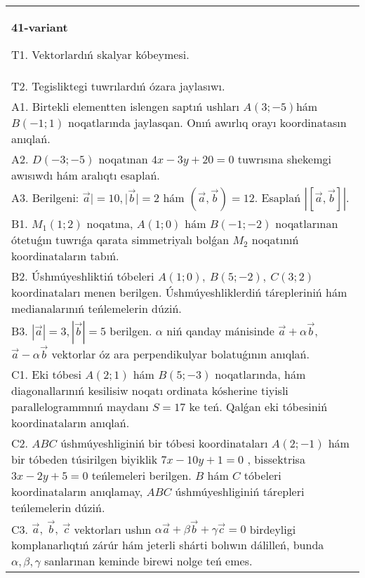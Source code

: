 \documentclass{article}
\begin{document}
\begin{tabular}{m{17cm}}
\textbf{41-variant}
\newline

T1. 
Vektorlardıń skalyar kóbeymesi.
 \\
T2. 
Tegisliktegi tuwrılardıń ózara jaylasıwı.
 \\
A1. 
Birtekli elementten islengen saptıń ushları
$A(3;-5)$hám $B(-1;1)$ noqatlarında jaylasqan. Onıń awırlıq
orayı koordinatasın anıqlań.
 \\
A2. 
$D(-3;-5)$ noqatınan $4x-3y+20=0$ tuwrısına 
shekemgi awısıwdı hám aralıqtı esaplań.
 \\
A3. 
Berilgeni: $\overrightarrow{a}| = 10,|\overrightarrow{b}| = 2$ hám
$\left(\overrightarrow{a},\overrightarrow{b} \right) = 12$. Esaplań
$\left| \left\lbrack \overrightarrow{a},\overrightarrow{b} \right\rbrack \right|$.
 \\
B1. 
\(M_{1}(1;2)\) noqatına, \(A(1;0)\) hám \(B(-1;-2)\)
noqatlarınan ótetuǵın tuwrıǵa qarata simmetriyalı bolǵan \(M_{2}\) noqatınıń koordinataların tabıń.
 \\
B2. 
Úshmúyeshliktiń tóbeleri \(A(1;0),\ B(5;-2),\ C(3;2)\)
koordinataları menen berilgen. Úshmúyeshliklerdiń tárepleriniń hám
medianalarınıń teńlemelerin dúziń.
 \\
B3. 
$|\vec{a}| = 3,|\vec{b}| = 5$ berilgen. $\alpha$ niń qanday mánisinde $\vec{a} + \alpha\vec{b}$, $\vec{a} - \alpha\vec{b}$ vektorlar óz ara perpendikulyar bolatuǵının anıqlań.
 \\
C1. 
Eki tóbesi \(A(2;1)\) hám \(B(5; - 3)\) noqatlarında, hám
diagonallarınıń kesilisiw noqatı ordinata kósherine tiyisli
parallelogrammnıń maydanı \(S = 17\) ke teń. Qalǵan eki tóbesiniń
koordinataların anıqlań. \\
C2. 
$ABC$ úshmúyeshliginiń bir tóbesi koordinataları
\(A(2; - 1)\) hám bir tóbeden túsirilgen biyiklik
\( 7x - 10y + 1 = 0\) , bissektrisa \(3x - 2y + 5 = 0\) 
teńlemeleri berilgen. $B$ hám $C$ tóbeleri koordinataların
anıqlamay, $ABC$ úshmúyeshliginiń tárepleri teńlemelerin dúziń.
 \\
C3. 
\(\vec{a},\ \vec{b},\ \vec{c}\) vektorları ushın \(\alpha\vec{a} + \beta\vec{b} + \gamma\vec{c} = 0\) birdeyligi komplanarlıqtıń zárúr hám jeterli shárti bolıwın dálilleń, bunda \(\alpha,\beta,\gamma\) sanlarınan keminde birewi nolge teń emes. \\

\end{tabular}
\vspace{1cm}
\end{document}
